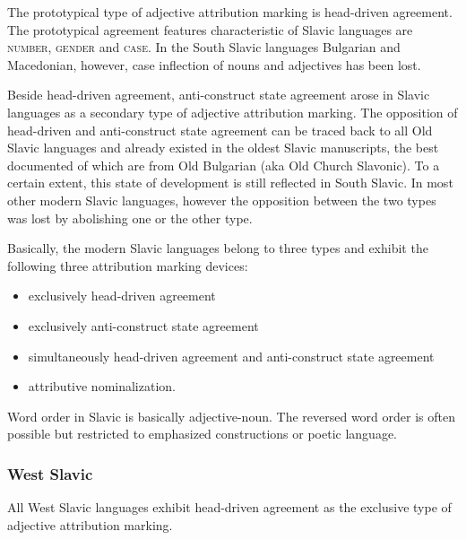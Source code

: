 The prototypical type of adjective attribution marking is head-driven agreement. The prototypical agreement features characteristic of Slavic languages are \textsc{number}, \textsc{gender} and \textsc{case}. In the South Slavic languages Bulgarian and Macedonian, however, case inflection of nouns and adjectives has been lost.

Beside head-driven agreement, anti-construct state agreement arose in Slavic languages as a secondary type of adjective attribution marking. The opposition of head-driven and anti-construct state agreement can be traced back to all Old Slavic languages and already existed in the oldest Slavic manuscripts, the best documented of which are from Old Bulgarian (aka Old Church Slavonic). To a certain extent, this state of development is still reflected in South Slavic. In most other modern Slavic languages, however the opposition between the two types was lost by abolishing one or the other type.

Basically, the modern Slavic languages belong to three types and exhibit the following three attribution marking devices:
\begin{itemize}
\item{exclusively head-driven agreement}
\item{exclusively anti-construct state agreement}
\item{simultaneously head-driven agreement and anti-construct state agreement}
\item{attributive nominalization.}
\end{itemize}
Word order in Slavic is basically adjective-noun. The reversed word order is often possible but restricted to emphasized constructions or poetic language. 

\subsubsection{West Slavic}
All West Slavic languages exhibit head-driven agreement as the exclusive type of adjective attribution marking.

